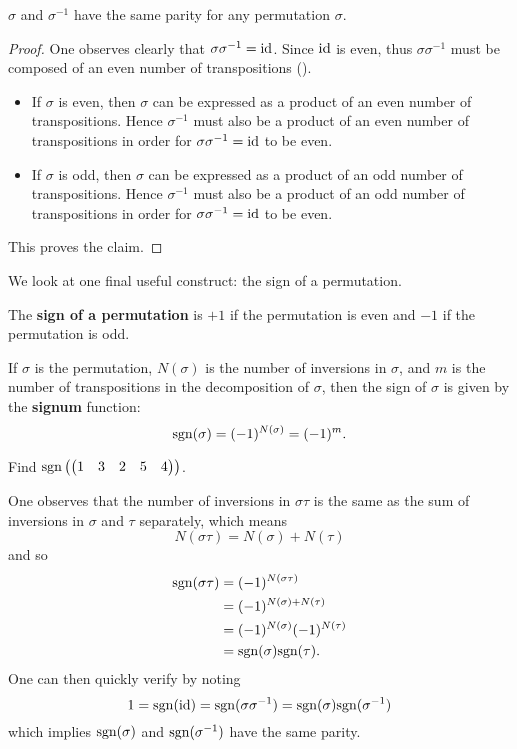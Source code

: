 \begin{corollary}\label{corollary-permutation-and-inverse-have-same-parity}
    $\sigma$ and $\sigma^{-1}$ have the same parity for any permutation $\sigma$.
\end{corollary}
\begin{proof}
    One observes clearly that $\sigma\sigma^{-1} = \mathrm{id}$. Since $\mathrm{id}$ is even, thus $\sigma\sigma^{-1}$ must be composed of an even number of transpositions ().
    \begin{itemize}
        \item If $\sigma$ is even, then $\sigma$ can be expressed as a product of an even number of transpositions. Hence $\sigma^{-1}$ must also be a product of an even number of transpositions in order for $\sigma\sigma^{-1} = \mathrm{id}$ to be even.
        \item If $\sigma$ is odd, then $\sigma$ can be expressed as a product of an odd number of transpositions. Hence $\sigma^{-1}$ must also be a product of an odd number of transpositions in order for $\sigma\sigma^{-1} = \mathrm{id}$ to be even.
    \end{itemize}
    This proves the claim.
\end{proof}

We look at one final useful construct: the sign of a permutation.
\begin{definition}
    The \textbf{sign of a permutation} is $+1$ if the permutation is even and $-1$ if the permutation is odd.
\end{definition}
If $\sigma$ is the permutation, $N(\sigma)$ is the number of inversions in $\sigma$, and $m$ is the number of transpositions in the decomposition of $\sigma$, then the sign of $\sigma$ is given by the \textbf{signum} function:
\[
    \mathrm{sgn}(\sigma) = (-1)^{N(\sigma)} = (-1)^m.
\]
\begin{exercise}
    Find $\mathrm{sgn}\left(\begin{pmatrix}1&3&2&5&4\end{pmatrix}\right)$.
\end{exercise}

One observes that the number of inversions in $\sigma\tau$ is the same as the sum of inversions in $\sigma$ and $\tau$ separately, which means
\[
    N(\sigma\tau) = N(\sigma) + N(\tau)
\]
and so
\begin{align*}
    \mathrm{sgn}(\sigma\tau) &= (-1)^{N(\sigma\tau)}\\
    &= (-1)^{N(\sigma) + N(\tau)}\\
    &= (-1)^{N(\sigma)}(-1)^{N(\tau)}\\
    &= \mathrm{sgn}(\sigma)\mathrm{sgn}(\tau).
\end{align*}
One can then quickly verify  by noting
\[
    1 = \mathrm{sgn}(\mathrm{id}) = \mathrm{sgn}(\sigma\sigma^{-1}) = \mathrm{sgn}(\sigma)\mathrm{sgn}(\sigma^{-1})
\]
which implies $\mathrm{sgn}(\sigma)$ and $\mathrm{sgn}(\sigma^{-1})$ have the same parity.


